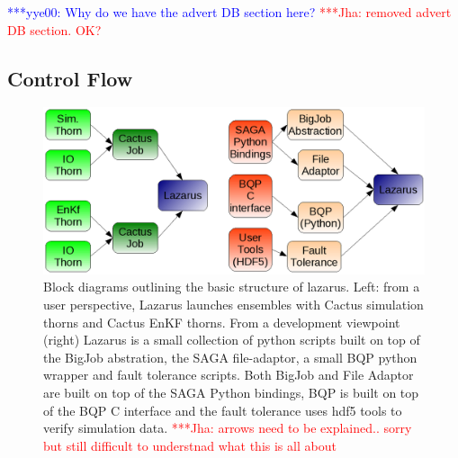 \documentclass[conference,final]{IEEEtran}
\newcommand{\jhanote}[1]{ {\textcolor{red} { ***Jha: #1 }}}
\newcommand{\yyenote}[1]{ {\textcolor{blue} { ***yye00: #1 }}}
\newcommand{\jhanote}[1]{}
\newcommand{\yyenote}[1]{}
\begin{document}
\yyenote{Why do we have the advert DB section here?}
\jhanote{removed advert DB section. OK?}

\subsection{Control Flow}

\begin{figure}
\begin{center}
\includegraphics[scale=0.29]{./figures/BreakdownDiagram.png}
\caption{Block diagrams outlining the basic structure of lazarus.
Left: from a user perspective, Lazarus launches ensembles with
Cactus simulation thorns and Cactus EnKF thorns. From a development
viewpoint (right) Lazarus is a small collection of python scripts built
on top of the BigJob abstration, the SAGA file-adaptor, a small
BQP python wrapper and fault tolerance scripts. Both BigJob
and File Adaptor are built on top of the SAGA Python bindings, BQP
is built on top of the BQP C interface and the fault tolerance uses
hdf5 tools to verify simulation data.
\jhanote{arrows need to be
    explained.. sorry but still difficult to understnad what this is
    all about}}
\end{center}

\label{fig:application_architecture}
\end{figure}
\end{document}
